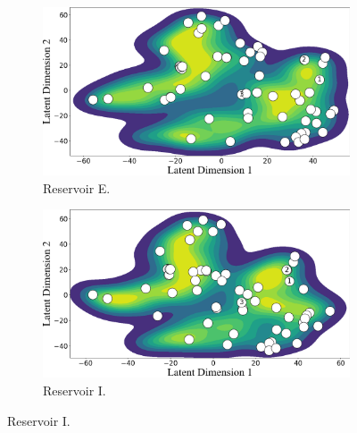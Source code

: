 \begin{frame}
	\begin{figure}[htbp]
		\centering
		\begin{subfigure}[t]{0.38\columnwidth}
			\centering
			\includegraphics[width=\columnwidth]{chp_sogp/figures/TSNE_task4_kde_p30.png}
			\caption{Reservoir E.}
			\label{fig:points_locations_E}
		\end{subfigure}
		\hspace{0.05\columnwidth} %
		\begin{subfigure}[t]{0.38\columnwidth}
			\centering
			\includegraphics[width=\columnwidth]{chp_sogp/figures/TSNE_task8_kde_p30.png}
			\caption{Reservoir I.}
			\label{fig:points_locations_I}
		\end{subfigure}
		
		\vspace{0.3cm} %
		

\end{figure}
\end{frame}
